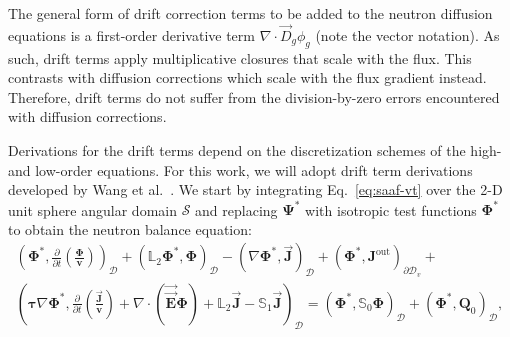 The general form of drift correction terms to be added to the neutron diffusion equations is a
first-order derivative term $\nabla\cdot \vec{D}_g\phi_g$ (note the vector notation). As such,
drift terms apply
multiplicative closures that scale with the flux. This contrasts with diffusion
corrections which scale with the flux gradient instead. Therefore, drift terms do not suffer from
the division-by-zero errors encountered with diffusion corrections.

Derivations for the drift terms depend on the discretization schemes of the high- and low-order
equations. For this work, we will adopt drift term derivations developed by Wang et al.\
\cite{wang_diffusion_2014, wang_rattlesnake_2018}. We start by integrating Eq.\ \ref{eq:saaf-vt}
over the 2-D unit sphere angular domain $\mathcal{S}$ and replacing $\bm{\Psi}^*$ with isotropic
test functions $\bm{\Phi}^*$ to obtain the neutron balance equation:
%
\begin{multline}
  \left(\bm{\Phi}^*,\frac{\partial}{\partial t}\left(\frac{\bm{\Phi}}{\bm{v}}\right)\right)_\mathcal{D}
  + \left(\mathbb{L}_2\bm{\Phi}^*,\bm{\Phi}\right)_\mathcal{D}
  - \left(\nabla\bm{\Phi}^*,\vec{\bm{J}}\right)_\mathcal{D}
  + \left(\bm{\Phi}^*,\bm{J}^\text{out}\right)_{\partial\mathcal{D}_v} + \\
  \left(\bm{\tau}\nabla\bm{\Phi}^*, \frac{\partial}{\partial t}\left(\frac{\vec{\bm{J}}}{\bm{v}}\right)
    + \nabla\cdot(\vec{\vec{\bm{E}}}\bm{\Phi}) +\mathbb{L}_2\vec{\bm{J}} -
    \mathbb{S}_1\vec{\bm{J}}\right)_\mathcal{D}
  = \left(\bm{\Phi}^*,\mathbb{S}_0\bm{\Phi}\right)_\mathcal{D}
  + \left(\bm{\Phi}^*,\bm{Q}_0\right)_\mathcal{D},
\end{multline}
%
